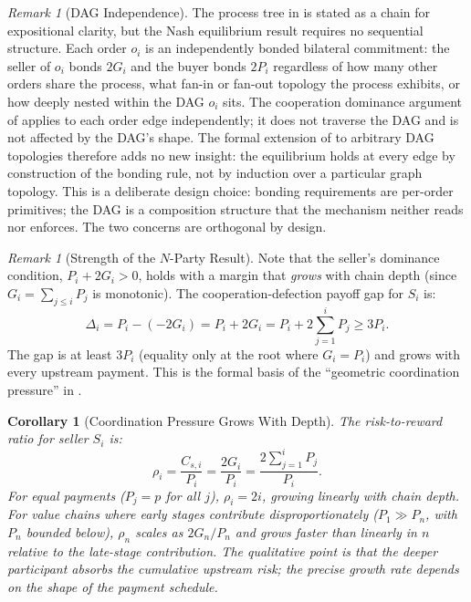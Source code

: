 \documentclass[11pt,a4paper]{article}
\newtheorem{corollary}[theorem]{Corollary}
\theoremstyle{definition}
\theoremstyle{remark}
\newtheorem{remark}[theorem]{Remark}
\newcommand{\pay}{P}           %
\newcommand{\cumval}{G}        %
\begin{document}
\begin{remark}[DAG Independence]
\label{rem:dag-independence}
The process tree in  is stated as a chain for
expositional clarity, but the Nash equilibrium result requires no
sequential structure. Each order $o_i$ is an independently bonded
bilateral commitment: the seller of $o_i$ bonds $2\cumval_i$ and
the buyer bonds $2\pay_i$ regardless of how many other orders share
the process, what fan-in or fan-out topology the process exhibits,
or how deeply nested within the DAG $o_i$ sits. The cooperation
dominance argument of  applies to each order
edge independently; it does not traverse the DAG and is not
affected by the DAG's shape. The formal extension of
 to arbitrary DAG topologies therefore adds
no new insight: the equilibrium holds at every edge by construction
of the bonding rule, not by induction over a particular graph
topology. This is a deliberate design choice: bonding requirements
are per-order primitives; the DAG is a composition structure that
the mechanism neither reads nor enforces. The two concerns are
orthogonal by design.
\end{remark}

\begin{remark}[Strength of the $N$-Party Result]
Note that the seller's dominance condition,
$\pay_i + 2\cumval_i > 0$, holds with a margin that \emph{grows}
with chain depth (since $\cumval_i = \sum_{j \leq i} \pay_j$ is
monotonic). The cooperation-defection payoff gap for $S_i$ is:
\begin{equation}
  \Delta_i = \pay_i - (-2\cumval_i) = \pay_i + 2\cumval_i
    = \pay_i + 2\!\sum_{j=1}^{i} \pay_j \geq 3\pay_i.
\end{equation}
The gap is at least $3\pay_i$ (equality only at the root where
$\cumval_i = \pay_i$) and grows with every upstream payment. This
is the formal basis of the ``geometric coordination pressure'' in
.
\end{remark}

\begin{corollary}[Coordination Pressure Grows With Depth]
\label{cor:geometric-pressure}
The risk-to-reward ratio for seller $S_i$ is:
\begin{equation}
  \rho_i = \frac{C_{s,i}}{\pay_i} = \frac{2\cumval_i}{\pay_i}
    = \frac{2\sum_{j=1}^{i} \pay_j}{\pay_i}.
\end{equation}
For equal payments ($\pay_j = p$ for all $j$), $\rho_i = 2i$, growing
linearly with chain depth. For value chains where early stages
contribute disproportionately ($\pay_1 \gg \pay_n$, with $\pay_n$
bounded below), $\rho_n$ scales as $2 \cumval_n / \pay_n$ and grows
faster than linearly in $n$ relative to the late-stage contribution.
The qualitative point is that the deeper participant absorbs the
cumulative upstream risk; the precise growth rate depends on the
shape of the payment schedule.
\end{corollary}
\end{document}
